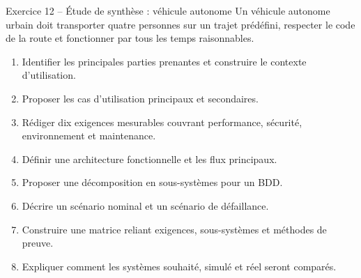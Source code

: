 \begin{TLExercise}{Exercice 12 -- Étude de synthèse : véhicule autonome}
Un véhicule autonome urbain doit transporter quatre personnes sur un trajet prédéfini, respecter le code de la route et fonctionner par tous les temps raisonnables.
\begin{enumerate}
  \item Identifier les principales parties prenantes et construire le contexte d'utilisation.
  \item Proposer les cas d'utilisation principaux et secondaires.
  \item Rédiger dix exigences mesurables couvrant performance, sécurité, environnement et maintenance.
  \item Définir une architecture fonctionnelle et les flux principaux.
  \item Proposer une décomposition en sous-systèmes pour un BDD.
  \item Décrire un scénario nominal et un scénario de défaillance.
  \item Construire une matrice reliant exigences, sous-systèmes et méthodes de preuve.
  \item Expliquer comment les systèmes souhaité, simulé et réel seront comparés.
\end{enumerate}
\end{TLExercise}
